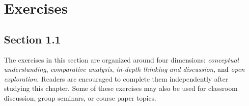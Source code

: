 %
%
%

\section*{Exercises}

\subsection*{Section 1.1}

\noindent
The exercises in this section are organized around four dimensions:
\emph{conceptual understanding}, \emph{comparative analysis},
\emph{in-depth thinking and discussion}, and \emph{open exploration}.
Readers are encouraged to complete them independently after studying this chapter.
Some of these exercises may also be used for classroom discussion, group seminars,
or course paper topics.

